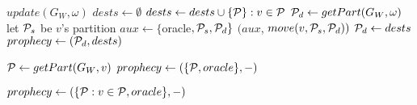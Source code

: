 \begin{algorithm}[t!]
\small

\begin{distribalgo}[1]

\vspace{1.5mm}


    \vspace{1.5mm}


    \vspace{1.5mm}


                \STATE $update(G_W, \omega)$
                \STATE $dests \leftarrow \emptyset$
                        \STATE $dests \leftarrow dests \cup \{ \mathcal{P} \}:v \in \mathcal{P}$
                    \ENDFOR
                        \STATE $\mathcal{P}_d \leftarrow getPart(G_W, \omega)$
                            \STATE let $\mathcal{P}_s$ be $v$'s partition
                                \STATE $aux \leftarrow \{$oracle$,\mathcal{P}_s,\mathcal{P}_d\}$    
                                \STATE \amcast$(aux$, $move(v,\mathcal{P}_s,\mathcal{P}_d))$
                            \ENDIF 
                        \ENDFOR
                    \ELSE
                        \STATE $\mathcal{P}_d \leftarrow dests$
                    \ENDIF 
                \STATE $prophecy \leftarrow (\mathcal{P}_d,dests)$

                    \STATE $\mathcal{P} \leftarrow getPart(G_W, v)$
                    \STATE $prophecy \leftarrow (\{ \mathcal{P}, oracle \}, -)$

                    \STATE $prophecy \leftarrow (\{ \mathcal{P} : v \in \mathcal{P}, oracle \}, -)$
                

\end{distribalgo}
\end{algorithm}
